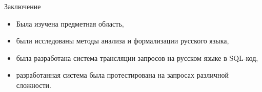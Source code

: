 \begin{frame}{Заключение}%
  \begin{itemize}%
    \item Была изучена предметная область,
    \item были исследованы методы анализа и формализации русского языка,
    \item была разработана система трансляции запросов на русском языке в SQL-код,
    \item разработанная система была протестирована на запросах различной сложности.
  \end{itemize}
\end{frame}
